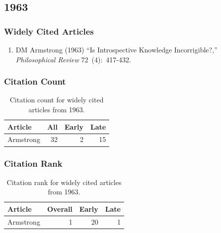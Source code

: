 \documentclass[
  10pt,
  letterpaper,
  DIV=11,
  numbers=noendperiod,
  twoside]{scrartcl}
\providecommand{\tightlist}{%
  \setlength{\itemsep}{0pt}\setlength{\parskip}{0pt}}\usepackage{longtable,booktabs,array}
\begin{document}
\newpage

\subsection{1963}\label{sec-s1963}

\subsubsection*{Widely Cited Articles}\label{widely-cited-articles-7}

\begin{enumerate}
\def\labelenumi{\arabic{enumi}.}
\tightlist
\item
  DM Armstrong (1963) ``Is Introspective Knowledge Incorrigible?,''
  \emph{Philosophical Review} 72~(4):~417-432.
\end{enumerate}

\subsubsection*{Citation Count}\label{sec-count-1963}

\begin{longtable}[]{@{}lrrr@{}}

\caption{\label{tbl-citation-count-1963}Citation count for widely cited
articles from 1963.}

\tabularnewline

\toprule\noalign{}
Article & All & Early & Late \\
\midrule\noalign{}
\endhead
\bottomrule\noalign{}
\endlastfoot
Armstrong & 32 & 2 & 15 \\

\end{longtable}

\subsubsection*{Citation Rank}\label{sec-rank-1963}

\begin{longtable}[]{@{}lrrr@{}}

\caption{\label{tbl-citation-rank-1963}Citation rank for widely cited
articles from 1963.}

\tabularnewline

\toprule\noalign{}
Article & Overall & Early & Late \\
\midrule\noalign{}
\endhead
\bottomrule\noalign{}
\endlastfoot
Armstrong & 1 & 20 & 1 \\

\end{longtable}
\end{document}
